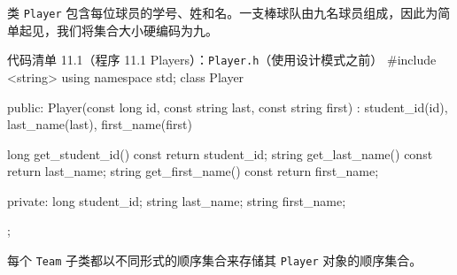 
类 \texttt{Player} 包含每位球员的学号、姓和名。一支棒球队由九名球员组成，因此为简单起见，我们将集合大小硬编码为九。

\begin{codeboxt}{代码清单 11.1（程序 11.1 Players）：\texttt{Player.h}（使用设计模式之前）}
#include <string>
using namespace std;
class Player
{

public:
    Player(const long id, const string last, const string first)
        : student_id(id), last_name(last), first_name(first) {}

    long   get_student_id() const { return student_id; }
    string get_last_name()  const { return last_name; }
    string get_first_name() const { return first_name; }

private:
    long   student_id;
    string last_name;
    string first_name;
};
\end{codeboxt}

每个 \texttt{Team} 子类都以不同形式的顺序集合来存储其 \texttt{Player} 对象的顺序集合。

